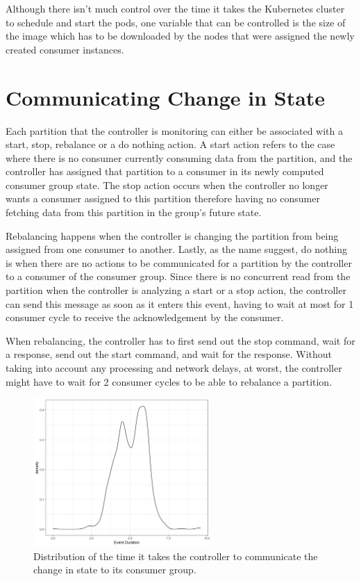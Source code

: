 Although there isn't much control over the time it takes the Kubernetes cluster
to schedule and start the pods, one variable that can be controlled is the size
of the image which has to be downloaded by the nodes that were assigned the
newly created consumer instances.

\section{Communicating Change in State}

Each partition that the controller is monitoring can either be associated with a
start, stop, rebalance or a do nothing action. A start action refers to the case
where there is no consumer currently consuming data from the partition, and the
controller has assigned that partition to a consumer in its newly computed
consumer group state. The stop action occurs when the controller no longer wants
a consumer assigned to this partition therefore having no consumer fetching data
from this partition in the group's future state. 

Rebalancing happens when the controller is changing the partition from being
assigned from one consumer to another. Lastly, as the name suggest, do nothing
is when there are no actions to be communicated for a partition by the
controller to a consumer of the consumer group. Since there is no concurrent
read from the partition when the controller is analyzing a start or a stop
action, the controller can send this message as soon as it enters this event,
having to wait at most for 1 consumer cycle to receive the acknowledgement by
the consumer. 

When rebalancing, the controller has to first send out the stop command, wait
for a response, send out the start command, and wait for the response. Without
taking into account any processing and network delays, at worst, the controller
might have to wait for 2 consumer cycles to be able to rebalance a partition.

\begin{figure}[htb!]
\centering
\includegraphics[width=0.6\textwidth]{images/integration/delta4.png}
\caption{
    Distribution of the time it takes the controller to communicate the change
    in state to its consumer group.
}
\label{fig:controller_result_change_state}
\end{figure}

